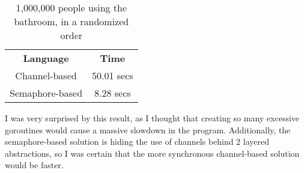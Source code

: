 \documentclass[a4paper,10pt]{article}
\begin{document}
\begin{table}[h]
    \centering
    \begin{tabular}{cc}
        \textbf{Language} & \textbf{Time}\\
        Channel-based & 50.01 secs\\
        Semaphore-based & 8.28 secs
    \end{tabular}
    \caption{1,000,000 people using the bathroom, in a randomized order}
\end{table}

I was very surprised by this result, as I thought that creating so many excessive goroutines would cause a massive slowdown in the program. Additionally, the semaphore-based solution is hiding the use of channels behind 2 layered abstractions, so I was certain that the more synchronous channel-based solution would be faster.
\end{document}
